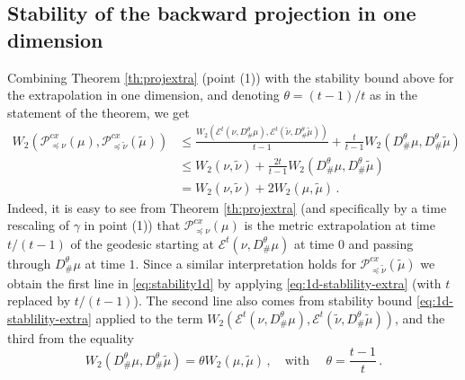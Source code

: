 \documentclass[12pt]{amsart}
\begin{document}
\subsection{Stability of the backward projection in one dimension}\label{sec:stabbackone} Combining Theorem \ref{th:projextra} (point (1)) with the stability bound above for the extrapolation in one dimension, and denoting $\theta = (t-1)/t$ as in the statement of the theorem, we get
\begin{equation}\label{eq:stability1d}
\begin{aligned}
    W_2(\mathscr{P}^{cx}_{\preceq \nu} (\mu), \mathscr{P}^{cx}_{\preceq \tilde{\nu}} (\tilde{\mu})) &\leq  \frac{W_2(\mathscr{E}^t(\nu, D^\theta_\#\mu), \mathscr{E}^t(\tilde{\nu}, D^\theta_\#\tilde{\mu}))}{t-1} + \frac{t}{t-1}W_2(D^\theta_\#\mu,D^\theta_\#\tilde{\mu}) \\
& \leq  W_2(\nu,\tilde{\nu}) + \frac{2t}{t-1} W_2(D^\theta _\#\mu,D^\theta_\#\tilde{\mu}) \\
&= W_2(\nu,\tilde{\nu}) + 2 W_2(\mu,\tilde{\mu})\,.
\end{aligned}
\end{equation}
Indeed,
it is easy to see from Theorem \ref{th:projextra} (and specifically by a time rescaling of $\gamma$ in point (1)) that  $\mathscr{P}^{cx}_{\preceq \nu} (\mu)$ is the metric extrapolation at time $t/(t-1)$ of the geodesic starting at $\mathscr{E}^t(\nu, D^\theta_\#\mu)$ at time $0$ and passing through  $D^\theta_\#\mu$ at time $1$.
Since a similar interpretation holds for $\mathscr{P}^{cx}_{\preceq \tilde{\nu}} (\tilde{\mu})$ we obtain the first line in \eqref{eq:stability1d} by applying \eqref{eq:1d-stablility-extra} (with $t$ replaced by $t/(t-1)$). The second line also comes from stability bound \eqref{eq:1d-stablility-extra} applied to the term $W_2(\mathscr{E}^t(\nu, D^\theta_\#\mu), \mathscr{E}^t(\tilde{\nu}, D^\theta_\#\tilde{\mu}))$, and the third from the equality \[
 W_2(D^\theta _\#\mu,D^\theta_\#\tilde{\mu}) =\theta  W_2(\mu,\tilde{\mu}) \,, \quad \text{with } \quad \theta = \frac{t-1}{t}\,.
\]
\end{document}
